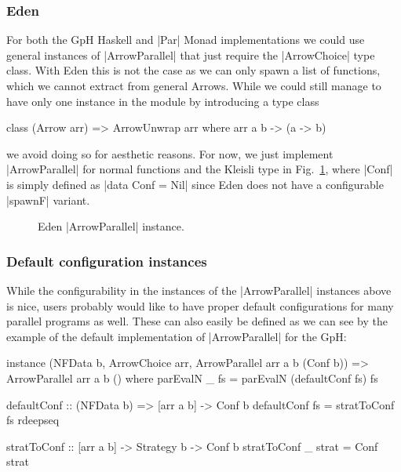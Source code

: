 \subsubsection{Eden}
For both the GpH Haskell and |Par| Monad implementations we could use general instances of |ArrowParallel| that just require the |ArrowChoice| type class. With Eden this is not the case as we can only spawn a list of functions, which we cannot extract from general Arrows. While we could still manage to have only one instance in the module by introducing a type class %
\begin{code}
class (Arrow arr) => ArrowUnwrap arr where
	arr a b -> (a -> b)
\end{code}
we avoid doing so for aesthetic reasons. For now, we just implement |ArrowParallel| for normal functions and the Kleisli type in Fig.~\ref{fig:ArrowParallelEden}, where |Conf| is simply defined as |data Conf = Nil| since Eden does not have a configurable |spawnF| variant. %
\begin{figure}[t]
\caption{Eden |ArrowParallel| instance.}
\label{fig:ArrowParallelEden}
\end{figure}

\subsubsection{Default configuration instances}
While the configurability in the instances of the |ArrowParallel| instances above is nice, users probably would like to have proper default configurations for many parallel programs as well. These can also easily be defined as we can see by the example of the default implementation of |ArrowParallel| for the GpH:

\begin{code}
instance (NFData b, ArrowChoice arr, ArrowParallel arr a b (Conf b)) =>
  ArrowParallel arr a b () where
    parEvalN _ fs = parEvalN (defaultConf fs) fs

defaultConf :: (NFData b) => [arr a b] -> Conf b
defaultConf fs = stratToConf fs rdeepseq

stratToConf :: [arr a b] -> Strategy b -> Conf b
stratToConf _ strat = Conf strat
\end{code}

